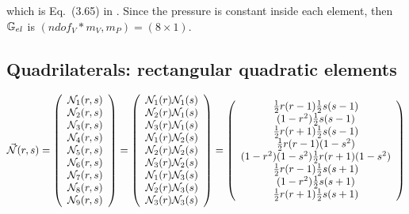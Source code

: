 which is Eq.~(3.65) in \textcite{elsw}.
Since the pressure is constant inside each element, then ${\mathbb{G}}_{el}$ is $(ndof_V*m_V,m_P)=(8\times 1)$.







\subsection{Quadrilaterals: rectangular quadratic elements} \label{app:qrqe}



\[
\vec{{\mathcal{N}}}(r,s) 
=
\left(
\begin{array}{c}
{\mathcal{N}}_1(r,s) \\ 
{\mathcal{N}}_2(r,s) \\
{\mathcal{N}}_3(r,s) \\
{\mathcal{N}}_4(r,s) \\
{\mathcal{N}}_5(r,s) \\
{\mathcal{N}}_6(r,s) \\
{\mathcal{N}}_7(r,s) \\
{\mathcal{N}}_8(r,s) \\
{\mathcal{N}}_9(r,s) 
\end{array}
\right)
=
\left(
\begin{array}{c}
{\mathcal{N}}_1(r) {\mathcal{N}}_1(s) \\
{\mathcal{N}}_2(r) {\mathcal{N}}_1(s) \\
{\mathcal{N}}_3(r) {\mathcal{N}}_1(s) \\
{\mathcal{N}}_1(r) {\mathcal{N}}_2(s) \\
{\mathcal{N}}_2(r) {\mathcal{N}}_2(s) \\
{\mathcal{N}}_3(r) {\mathcal{N}}_2(s) \\
{\mathcal{N}}_1(r) {\mathcal{N}}_3(s) \\
{\mathcal{N}}_2(r) {\mathcal{N}}_3(s) \\
{\mathcal{N}}_3(r) {\mathcal{N}}_3(s) 
\end{array}
\right)
=
\left(
\begin{array}{c}
 \frac{1}{2}r(r-1)  \frac{1}{2}s(s-1)\\
     (1-r^2)        \frac{1}{2}s(s-1)\\
 \frac{1}{2}r(r+1)  \frac{1}{2}s(s-1)\\
 \frac{1}{2}r(r-1)  (1-s^2)\\
     (1-r^2)        (1-s^2)
 \frac{1}{2}r(r+1)  (1-s^2)\\
 \frac{1}{2}r(r-1)  \frac{1}{2}s(s+1)\\
     (1-r^2)        \frac{1}{2}s(s+1)\\
 \frac{1}{2}r(r+1)  \frac{1}{2}s(s+1)\\
\end{array}
\right)
\]
